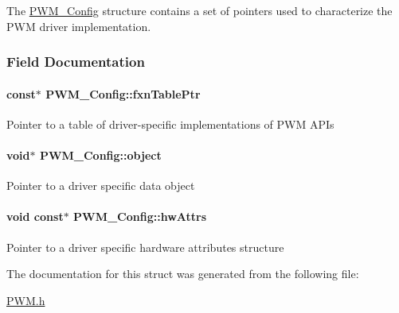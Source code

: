 The \hyperlink{struct_p_w_m___config}{P\+W\+M\+\_\+\+Config} structure contains a set of pointers used to characterize the P\+W\+M driver implementation. 

\subsubsection{Field Documentation}
\paragraph[{fxn\+Table\+Ptr}]{ const$\ast$ P\+W\+M\+\_\+\+Config\+::fxn\+Table\+Ptr}\label{struct_p_w_m___config_ac02604d8e0fafc8b5ff71171a4bf3461}
Pointer to a table of driver-\/specific implementations of P\+W\+M A\+P\+Is 
\paragraph[{object}]{\setlength{\rightskip}{0pt plus 5cm}void$\ast$ P\+W\+M\+\_\+\+Config\+::object}\label{struct_p_w_m___config_a33c57f0fe6b8af13f7a9c8ec392019a6}
Pointer to a driver specific data object 
\paragraph[{hw\+Attrs}]{\setlength{\rightskip}{0pt plus 5cm}void const$\ast$ P\+W\+M\+\_\+\+Config\+::hw\+Attrs}\label{struct_p_w_m___config_a2299aba19683340f917ca962a9536148}
Pointer to a driver specific hardware attributes structure 

The documentation for this struct was generated from the following file\+:\begin{DoxyCompactItemize}
\item 
\hyperlink{_p_w_m_8h}{P\+W\+M.\+h}\end{DoxyCompactItemize}
